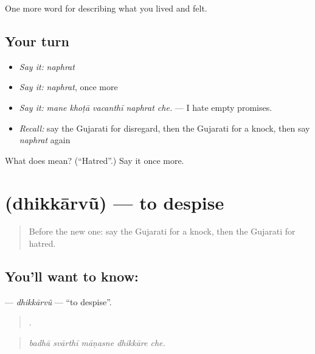 \begin{grammarlens}[title={What you've built}]
One more word for describing what you lived and felt.
\end{grammarlens}

\subsection*{Your turn}
\begin{itemize}
\raggedright
  \item \emph{Say it:} \emph{naphrat}
  \item \emph{Say it:} \emph{naphrat}, once more
  \item \emph{Say it:} \emph{mane khoṭā vacanthī naphrat che.} — I hate empty promises.
  \item \emph{Recall:} say the Gujarati for disregard, then the Gujarati for a knock, then say \emph{naphrat} again
\end{itemize}

\begin{tcolorbox}[breakable,colback=teal!4,colframe=teal!35!black,title={Before you move on}]
What does  mean? (\textquotedblleft{}Hatred\textquotedblright{}.) Say it once more.
\end{tcolorbox}
\section[\texorpdfstring{\gu{ધિક્કારવું} (dhikkārvũ)}{ધિક્કારવું (dhikkārvũ)}]{ (dhikkārvũ) — to despise}

\label{lesson:GU-C457-dhikkarvu}



\begin{quote}
Before the new one: say the Gujarati for a knock, then the Gujarati for hatred.
\end{quote}

\subsection*{You'll want to know: }
\textbf{} — \emph{dhikkārvũ} — \textquotedblleft{}to despise\textquotedblright{}.

\begin{quote}
    .
\end{quote}

\begin{quote}
\emph{badhā svārthī māṇasne dhikkāre che.}
\end{quote}

